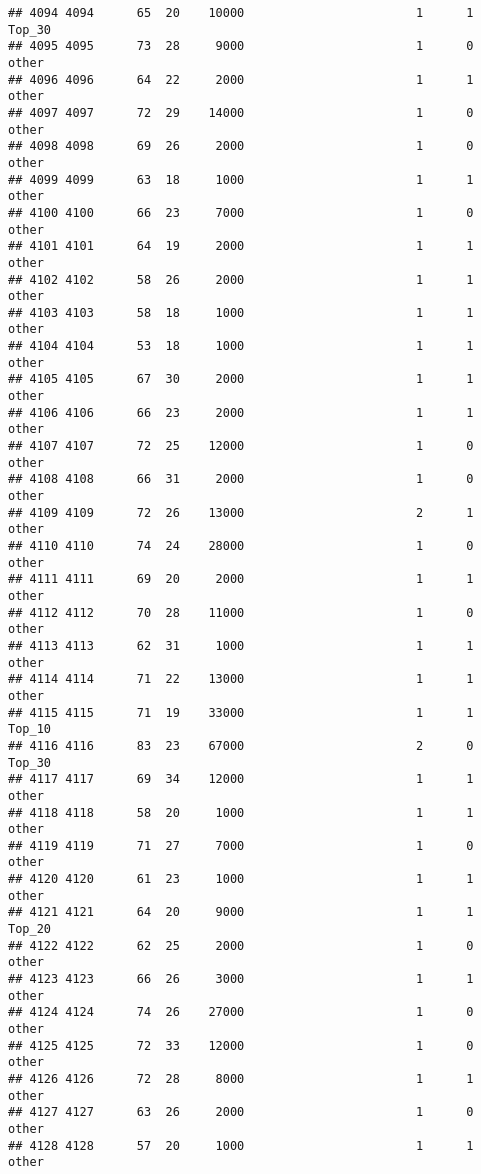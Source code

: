 \documentclass[
]{article}
\begin{document}
\begin{verbatim}
## 4094 4094      65  20    10000                        1      1   Top_30
## 4095 4095      73  28     9000                        1      0    other
## 4096 4096      64  22     2000                        1      1    other
## 4097 4097      72  29    14000                        1      0    other
## 4098 4098      69  26     2000                        1      0    other
## 4099 4099      63  18     1000                        1      1    other
## 4100 4100      66  23     7000                        1      0    other
## 4101 4101      64  19     2000                        1      1    other
## 4102 4102      58  26     2000                        1      1    other
## 4103 4103      58  18     1000                        1      1    other
## 4104 4104      53  18     1000                        1      1    other
## 4105 4105      67  30     2000                        1      1    other
## 4106 4106      66  23     2000                        1      1    other
## 4107 4107      72  25    12000                        1      0    other
## 4108 4108      66  31     2000                        1      0    other
## 4109 4109      72  26    13000                        2      1    other
## 4110 4110      74  24    28000                        1      0    other
## 4111 4111      69  20     2000                        1      1    other
## 4112 4112      70  28    11000                        1      0    other
## 4113 4113      62  31     1000                        1      1    other
## 4114 4114      71  22    13000                        1      1    other
## 4115 4115      71  19    33000                        1      1   Top_10
## 4116 4116      83  23    67000                        2      0   Top_30
## 4117 4117      69  34    12000                        1      1    other
## 4118 4118      58  20     1000                        1      1    other
## 4119 4119      71  27     7000                        1      0    other
## 4120 4120      61  23     1000                        1      1    other
## 4121 4121      64  20     9000                        1      1   Top_20
## 4122 4122      62  25     2000                        1      0    other
## 4123 4123      66  26     3000                        1      1    other
## 4124 4124      74  26    27000                        1      0    other
## 4125 4125      72  33    12000                        1      0    other
## 4126 4126      72  28     8000                        1      1    other
## 4127 4127      63  26     2000                        1      0    other
## 4128 4128      57  20     1000                        1      1    other

\end{verbatim}
\end{document}
